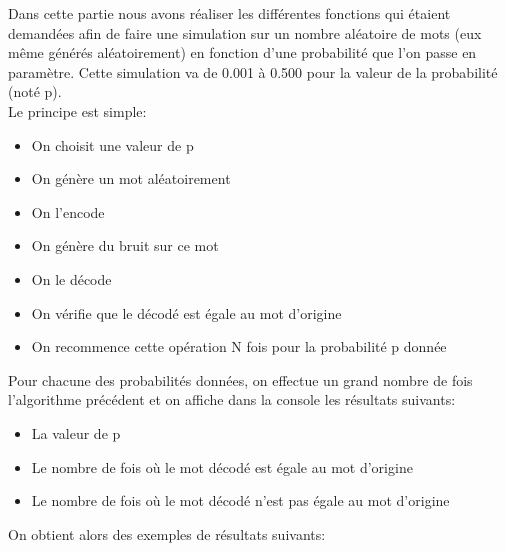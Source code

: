 Dans cette partie nous avons réaliser les différentes fonctions qui étaient demandées afin de faire une simulation sur un nombre aléatoire de mots (eux même générés aléatoirement) en fonction d'une probabilité que l'on passe en paramètre. Cette simulation va de 0.001 à 0.500 pour la valeur de la probabilité (noté p).\\
Le principe est simple:
\begin{itemize}
\item On choisit une valeur de p
\item On génère un mot aléatoirement
\item On l'encode
\item On génère du bruit sur ce mot
\item On le décode
\item On vérifie que le décodé est égale au mot d'origine
\item On recommence cette opération N fois pour la probabilité p donnée
\end{itemize}
Pour chacune des probabilités données, on effectue un grand nombre de fois l'algorithme précédent et on affiche dans la console les résultats suivants:
\begin{itemize}
\item La valeur de p
\item Le nombre de fois où le mot décodé est égale au mot d'origine
\item Le nombre de fois où le mot décodé n'est pas égale au mot d'origine
\end{itemize}
\newpage
On obtient alors des exemples de résultats suivants:
